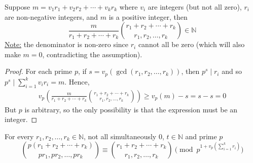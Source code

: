 \documentclass{treatise}
\begin{document}
\begin{corollary} \label{reduce-multi-int}
Suppose $m = v_1 r_1 + v_2 r_2 + \cdots + v_k r_k$ where $v_i$ are integers (but not all zero), $r_i$ are non-negative integers, and $m$ is a positive integer, then
$$\frac{m}{r_1 + r_2 + \cdots + r_k} {r_1 + r_2 + \cdots + r_k \choose r_1, r_2, \hdots, r_k} \in \mathbb{N}$$
\underline{Note:} the denominator is non-zero since $r_i$ cannot all be zero (which will also make $m = 0$, contradicting the assumption).
\end{corollary}
\begin{proof}
For each prime $p$, if $s = v_p (\gcd(r_1, r_2, \hdots, r_k))$, then $p^s \mid r_i$ and so $p^s \mid \sum_{i = 1}^k v_i r_i = m$. Hence,
\begin{align*}
v_p \left( \frac{m}{r_1 + r_2 + \cdots + r_k} {r_1 + r_2 + \cdots + r_k \choose r_1, r_2, \hdots, r_k} \right) \geq v_p (m) - s = s - s = 0
\end{align*}
But $p$ is arbitrary, so the only possibility is that the expression must be an integer.
\end{proof}
\begin{lemma} \label{p-adic-multi-cong}
For every $r_1, r_2, \hdots, r_k \in \mathbb{N}$, not all simultaneously 0, $t \in \mathbb{N}$ and prime $p$
$${p(r_1 + r_2 + \cdots + r_k) \choose p r_1, p r_2, \hdots, p r_k} \equiv {r_1 + r_2 + \cdots + r_k \choose r_1, r_2, \hdots, r_k} \pmod{p^{1 + v_p \left( \sum_{i = 1}^k r_i \right)}}$$
\end{lemma}
\end{document}
